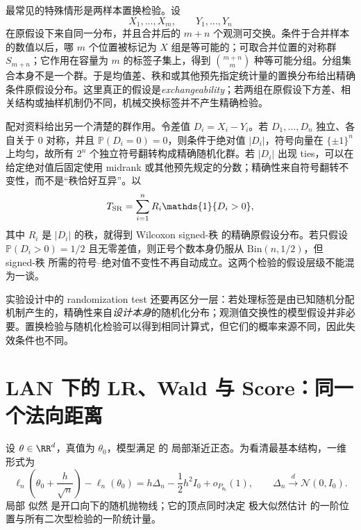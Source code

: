 \begin{workedexample}[两样本置换与交换性]
最常见的特殊情形是两样本置换检验。设
\[
 X_1,\ldots,X_m,
 \qquad
 Y_1,\ldots,Y_n
\]
在原假设下来自同一分布，并且合并后的 $m+n$ 个观测可交换。条件于合并样本的数值以后，哪 $m$ 个位置被标记为 $X$ 组是等可能的；可取合并位置的对称群 $S_{m+n}$；它作用在容量为 $m$ 的标签子集上，得到 $\binom{m+n}{m}$ 种等可能分组。分组集合本身不是一个群。于是均值差、秩和或其他预先指定统计量的置换分布给出精确条件原假设分布。这里真正的假设是\emph{exchangeability}；若两组在原假设下方差、相关结构或抽样机制仍不同，机械交换标签并不产生精确检验。
\end{workedexample}

\begin{workedexample}[符号检验与符号秩检验]
配对资料给出另一个清楚的群作用。令差值 $D_i=X_i-Y_i$。若 $D_1,\ldots,D_n$ 独立、各自关于 $0$ 对称，并且 $\mathbb P(D_i=0)=0$，则条件于绝对值 $|D_i|$，符号向量在 $\{\pm1\}^n$ 上均匀，故所有 $2^n$ 个独立符号翻转构成精确随机化群。若 $|D_i|$ 出现 ties，可以在给定绝对值后固定使用 midrank 或其他预先规定的分数；精确性来自符号翻转不变性，而不是“秩恰好互异”。以
\[
 T_{\rm SR}
 =\sum_{i=1}^n R_i\mathds{1}\{D_i>0\},
\]
其中 $R_i$ 是 $|D_i|$ 的秩，就得到 Wilcoxon signed-秩 的精确原假设分布。若只假设 $\mathbb P(D_i>0)=1/2$ 且无零差值，则正号个数本身仍服从 $\mathrm{Bin}(n,1/2)$，但 signed-秩 所需的符号--绝对值不变性不再自动成立。这两个检验的假设层级不能混为一谈。
\end{workedexample}

实验设计中的 randomization test 还要再区分一层：若处理标签是由已知随机分配机制产生的，精确性来自\emph{设计本身}的随机化分布；观测值交换性的模型假设并非必要。置换检验与随机化检验可以得到相同计算式，但它们的概率来源不同，因此失效条件也不同。

\section{LAN 下的 LR、Wald 与 Score：同一个法向距离}

\begin{definition}[局部二次似然实验]
设 $\theta\in\RR^d$，真值为 $\theta_0$，模型满足  的 局部渐近正态。为看清最基本结构，一维形式为
\begin{equation*}\ell_n\!\left(\theta_0+\frac h{\sqrt n}\right)-\ell_n(\theta_0)
 =h\Delta_n-\frac12h^2I_0+o_{P_{\theta_0}}(1),
 \qquad
 \Delta_n\xrightarrow{d}\mathcal N(0,I_0).
\end{equation*}
局部 似然 是开口向下的随机抛物线；它的顶点同时决定 极大似然估计 的一阶位置与所有二次型检验的一阶统计量。
\end{definition}

